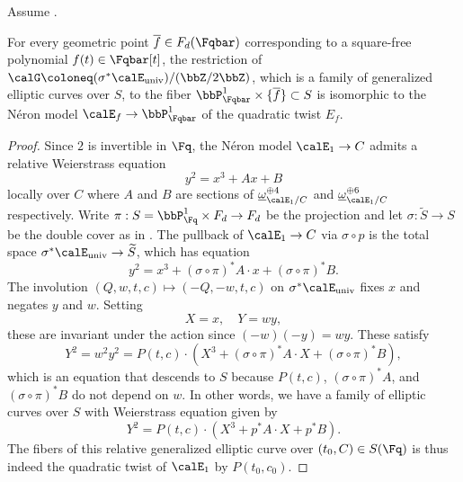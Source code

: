 \begin{proposition}  \label{proposition:fiber_of_quadratic_twist_of_family_of_neron_model_of_elliptic_curves_over_F_q_t_over_polynomials_at_a_polynomial_is_quadaratic_twist_of_elliptic_curve_by_polynomial}
    Assume .

    For every geometric point $\overline{f} \in F_d(\Fqbar)$ corresponding to a square-free polynomial $f(t) \in \Fqbar[t]$, the restriction of $\calG \coloneq (\sigma^* \calE_{\text{univ}})/(\bbZ/2\bbZ)$, which is a family of generalized elliptic curves over $S$, to the fiber $\bbP_{\Fqbar}^1 \times \{\overline{f}\} \subset S$ is isomorphic to the N\'eron model $\calE_f \to \bbP_{\Fqbar}^1$ of the quadratic twist $E_f$. 
\end{proposition}
\begin{proof}
    Since $2$ is invertible in $\Fq$, the N\'eron model $\calE_1 \to C$ admits a relative Weierstrass equation
    $$y^2 = x^3 + Ax + B$$
    locally over $C$ where $A$ and $B$ are sections of $\underline{\omega}_{\calE_1/C}^{\oplus 4}$ and $\underline{\omega}_{\calE_1/C}^{\oplus 6}$ respectively. Write $\pi: S = \bbP_{\Fq}^1 \times F_d \to F_d$ be the projection and let $\sigma: \widetilde{S} \to S$ be the double cover as in . The pullback of $\calE_1 \to C$ via $\sigma \circ p$ is the total space $\sigma^* \calE_{\text{univ}} \to \widetilde{S}$, which has equation
    $$y^2 = x^3 + (\sigma \circ \pi)^* A \cdot x + (\sigma \circ \pi)^* B.$$
    The involution $(Q,w,t,c) \mapsto (-Q,-w,t,c)$ on $\sigma^* \calE_{\text{univ}}$ fixes $x$ and negates $y$ and $w$. Setting
    $$X = x, \quad Y = wy,$$
    these are invariant under the action since $(-w)(-y) = wy$. These satisfy
    $$Y^2 = w^2 y^2 = P(t,c) \cdot \left( X^3 + (\sigma \circ \pi)^* A \cdot X + (\sigma \circ \pi)^* B \right),$$
    which is an equation that descends to $S$ because $P(t,c)$, $(\sigma \circ \pi)^* A$, and $(\sigma \circ \pi)^* B$ do not depend on $w$. In other words, we have a family of elliptic curves over $S$ with Weierstrass equation given by
    $$Y^2 = P(t,c) \cdot (X^3 + p^* A \cdot X + p^* B).$$
    The fibers of this relative generalized elliptic curve over $(t_0, C) \in S(\Fq)$ is thus indeed the quadratic twist of $\calE_1$ by $P(t_0,c_0)$.
\end{proof}

